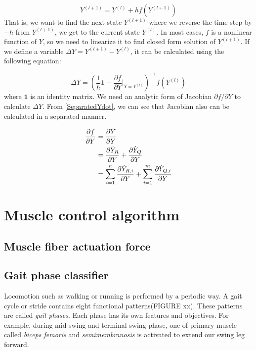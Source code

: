 \documentclass[a4paper,10pt]{article}
\begin{document}
\begin{equation}
Y^{(l+1)}=Y^{(l)}+hf(Y^{(l+1)})
\end{equation}
That is, we want to find the next state $Y^{(l+1)}$ where we
reverse the time step by $-h$ from $Y^{(l+1)}$, we get to the current state
$Y^{(l)}$. In most cases, $f$ is a nonlinear function of $Y$, so we need to
linearize it to find closed form solution of $Y^{(l+1)}$. If we define a
variable $\Delta Y = Y^{(l+1)}-Y^{(l)}$, it can be calculated using the
following equation:

\begin{equation}\label{DeltaY}
\Delta Y = \left(  \frac{1}{h}\mathbf{1} - {\frac{\partial f}{\partial Y} \bigg|_{Y=Y^{(l)}}}\right)^{-1} f(Y^{(l)})
\end{equation}
where $\mathbf{1}$ is an identity matrix. We need an analytic form of
Jacobian $\partial f / \partial Y$ to calculate $\Delta Y$.
From \eqref{SeparatedYdot}, we can see that
Jacobian also can be calculated in a separated manner.


\begin{align}
\frac{\partial f}{\partial Y}
        & = \frac{\partial\dot{Y}}{\partial Y}\notag\\
        & = \frac{\partial\dot{Y}_R}{\partial Y} + \frac{\partial\dot{Y}_Q}{\partial Y}\notag\\
        & = \sum_{i=1}^{n}\frac{\partial\dot{Y}_{R,i}}{\partial Y} + \sum_{i=1}^{m}\frac{\partial\dot{Y}_{Q,i}}{\partial Y}
\end{align}



\section{Muscle control algorithm}

\subsection{Muscle fiber actuation force}

\subsection{Gait phase classifier}

Locomotion such as walking or running is performed by a periodic way.
A gait cycle or stride contains eight functional patterns(FIGURE xx).
\cite{perry} These patterns are called \emph{gait phases}. Each phase has its
own features and objectives. For example, during mid-swing and terminal swing
phase, one of primary muscle called \emph{biceps femoris} and \emph{semimembranosis} is
activated to extend our swing leg forward.
\end{document}
